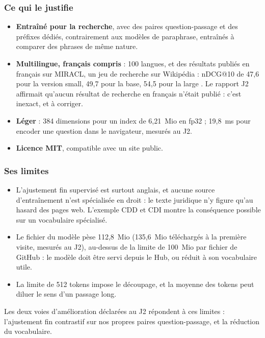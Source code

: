 \subsubsection{Ce qui le justifie}
\begin{itemize}
\item \textbf{Entraîné pour la recherche}, avec des paires question-passage et des préfixes dédiés, contrairement
  aux modèles de paraphrase, entraînés à comparer des phrases de même nature.
\item \textbf{Multilingue, français compris} : 100 langues, et des résultats publiés en français sur MIRACL, un
  jeu de recherche sur Wikipédia : nDCG@10 de 47,6 pour la version small, 49,7 pour la base, 54,5 pour la large
  \source. Le rapport J2 affirmait qu'aucun résultat de recherche en français n'était publié : c'est inexact, et à
  corriger.
\item \textbf{Léger} : 384 dimensions pour un index de 6,21~Mio en fp32 ; 19,8~ms pour encoder une question dans
  le navigateur, mesurés au J2.
\item \textbf{Licence MIT}, compatible avec un site public.
\end{itemize}

\subsubsection{Ses limites}
\begin{itemize}
\item L'ajustement fin supervisé est surtout anglais, et aucune source d'entraînement n'est spécialisée en droit :
  le texte juridique n'y figure qu'au hasard des pages web. L'exemple CDD et CDI montre la conséquence possible
  sur un vocabulaire spécialisé.
\item Le fichier du modèle pèse 112,8~Mio (135,6~Mio téléchargés à la première visite, mesurés au J2), au-dessus
  de la limite de 100~Mio par fichier de GitHub : le modèle doit être servi depuis le Hub, ou réduit à son
  vocabulaire utile.
\item La limite de 512 tokens impose le découpage, et la moyenne des tokens peut diluer le sens d'un passage long.
\end{itemize}

Les deux voies d'amélioration déclarées au J2 répondent à ces limites : l'ajustement fin contrastif sur nos propres
paires question-passage, et la réduction du vocabulaire.

